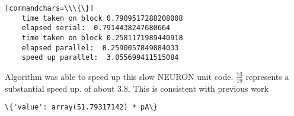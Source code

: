 \begin{verbatim}[commandchars=\\\{\}]
    time taken on block 0.7909517288208008
    elapsed serial:  0.7914438247680664
    time taken on block 0.2581171989440918
    elapsed parallel:  0.2590057849884033
    speed up parallel:  3.055699411515084
\end{verbatim}




Algorithm was able to speed up this slow NEURON unit code. $ \frac{73}{19} $ represents a substantial speed up. of about 3.8. This is consistent with previous work

\begin{verbatim}
\{'value': array(51.79317142) * pA\}
\end{verbatim}


